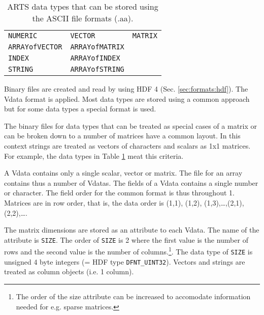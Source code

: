 \begin{table}[t]
  \begin{tabular}{p{4.5cm} p{4.5cm} p{4.5cm}}
   \verb|NUMERIC|        & \verb|VECTOR|         & \verb|MATRIX|          \\
   \verb|ARRAYofVECTOR|  & \verb|ARRAYofMATRIX|  &                        \\
   \verb|INDEX|          & \verb|ARRAYofINDEX|  &                        \\
   \verb|STRING|          & \verb|ARRAYofSTRING|  &                        \\
  \end{tabular}
  \caption{ARTS data types that can be stored using the ASCII
           file formats (.aa).}
  \label{table:format:aa}
 \end{table}
 

 \label{sec:formats:file:binary}
  
 Binary files are created and read by using HDF 4 (Sec.
 \ref{sec:formats:hdf}). The Vdata format is applied. Most data types
 are stored using a common approach but for some data types a special 
 format is used.

 \label{sec:formats:file:binary:general}
 
 The binary files for data types that can be treated as special cases
 of a matrix or can be broken down to a number of matrices have a
 common layout. In this context strings are treated as vectors of
 characters and scalars as 1x1 matrices. For example, the data types
 in Table \ref{table:format:aa} meat this criteria.
 
 A Vdata contains only a single scalar, vector or matrix. The file for
 an array contains thus a number of Vdatas. The fields of a Vdata
 contains a single number or character. The field order for the common
 format is thus throughout 1. Matrices are in row order, that is, 
 the data order is (1,1), (1,2), (1,3),\dots,(2,1),(2,2),\dots.
 
 The matrix dimensions are stored as an attribute to each Vdata. The
 name of the attribute is \verb|SIZE|. The order of \verb|SIZE| is 2
 where the first value is the number of rows and the second value is
 the number of columns.\footnote{The order of the size attribute can
   be increased to accomodate information needed for e.g. sparse
   matrices.}. The data type of \verb|SIZE| is unsigned 4 byte
 integers (= HDF type \verb|DFNT_UINT32|). Vectors and strings are
 treated as column objects (i.e. 1 column).
 
